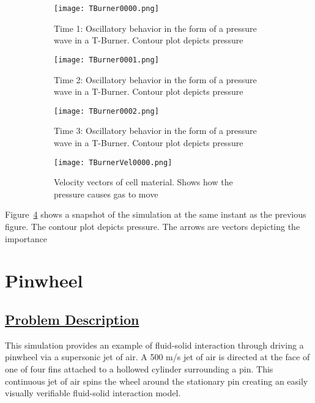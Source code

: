 \begin{figure}[htb!]
  \centering
  \begin{subfigure}[b]{0.25\textwidth}
    \texttt{[image: TBurner0000.png]}
    \caption{Time 1: Oscillatory behavior in the form of a pressure wave in a T-Burner.  Contour plot depicts pressure}
    \label{figtburn1}
  \end{subfigure}

  \begin{subfigure}[b]{0.25\textwidth}
    \texttt{[image: TBurner0001.png]}
    \caption{Time 2: Oscillatory behavior in the form of a pressure wave in a T-Burner.  Contour plot depicts pressure}
    \label{figtburn2}
  \end{subfigure}

  \begin{subfigure}[b]{0.25\textwidth}
    \texttt{[image: TBurner0002.png]}
    \caption{Time 3: Oscillatory behavior in the form of a pressure wave in a T-Burner.  Contour plot depicts pressure}
    \label{figtburn3}
  \end{subfigure}

  \begin{subfigure}[b]{0.25\textwidth}
    \texttt{[image: TBurnerVel0000.png]}
    \caption{Velocity vectors of cell material.  Shows how the pressure causes gas to move}
    \label{figtburnVel}
  \end{subfigure}

  \caption{}
  \label{fig:mpmice3}
\end{figure}


Figure~\ref{figtburnVel} shows a snapshot of the simulation at the same instant as the 
previous figure.  The contour plot depicts pressure.  The arrows are vectors depicting
the importance   

%
\newpage
\section*{\center  Pinwheel}
\subsection*{\underline{Problem Description}}
This simulation provides an example of fluid-solid interaction through driving a pinwheel via a supersonic jet of air. A 500 m/s jet of air is directed at the face of one of four fins attached to a hollowed cylinder surrounding a pin. This continuous jet of air spins the wheel around the stationary pin creating an easily visually verifiable fluid-solid interaction model. 

